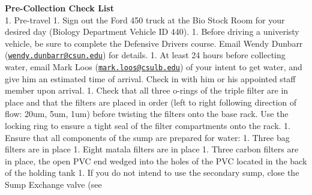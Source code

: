 \documentclass[]{book}
\begin{document}
 \textbf{Pre-Collection Check List}\\
1. Pre-travel 1. Sign out the Ford 450 truck at the Bio Stock Room for
your desired day (Biology Department Vehicle ID 440). 1. Before driving
a univeristy vehicle, be sure to complete the Defensive Drivers course.
Email Wendy Dunbarr
(\href{mailto:wendy.dunbarr@csun.edu}{\nolinkurl{wendy.dunbarr@csun.edu}})
for details. 1. At least 24 hours before collecting water, email Mark
Loos
(\href{mailto:mark.loos@csulb.edu}{\nolinkurl{mark.loos@csulb.edu}}) of
your intent to get water, and give him an estimated time of arrival.
Check in with him or his appointed staff member upon arrival. 1. Check
that all three o-rings of the triple filter are in place and that the
filters are placed in order (left to right following direction of flow:
20um, 5um, 1um) before twisting the filters onto the base rack. Use the
locking ring to ensure a tight seal of the filter compartments onto the
rack. 1. Ensure that all components of the sump are prepared for water:
1. Three bag filters are in place 1. Eight matala filters are in place
1. Three carbon filters are in place, the open PVC end wedged into the
holes of the PVC located in the back of the holding tank 1. If you do
not intend to use the secondary sump, close the Sump Exchange valve (see
\end{document}

